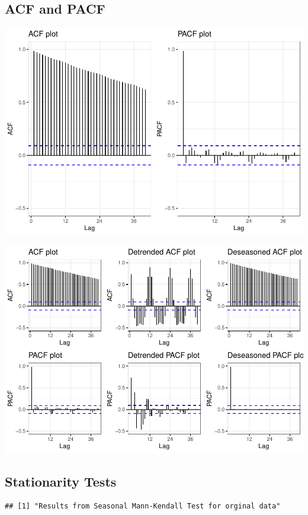\documentclass[
]{article}
\begin{document}
\subsection{ACF and PACF}\label{acf-and-pacf}

\includegraphics{Methane_Forecasting_files/figure-latex/unnamed-chunk-4-1.pdf}

\includegraphics{Methane_Forecasting_files/figure-latex/unnamed-chunk-5-1.pdf}

\subsection{Stationarity Tests}\label{stationarity-tests}

\begin{verbatim}
## [1] "Results from Seasonal Mann-Kendall Test for orginal data"
\end{verbatim}
\end{document}
